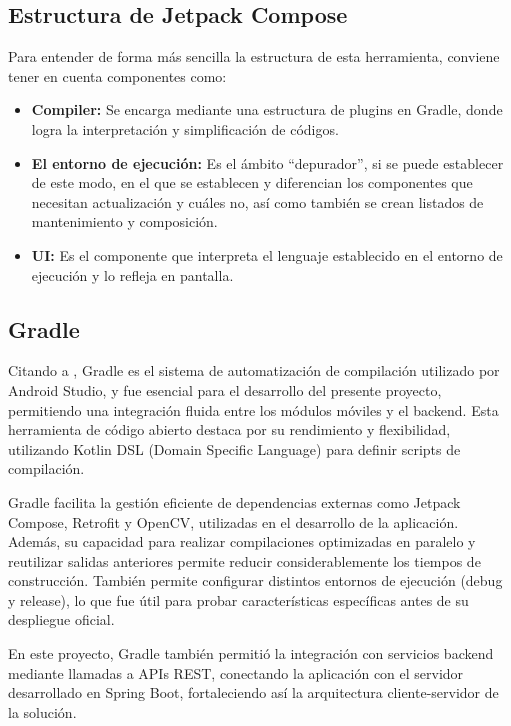 \subsection*{Estructura de Jetpack Compose}
Para entender de forma más sencilla la estructura de esta herramienta, conviene tener en cuenta componentes como:
\begin{itemize}
	\item \textbf{Compiler:} Se encarga mediante una estructura de plugins en Gradle, donde logra la interpretación y simplificación de códigos.
	\item \textbf{El entorno de ejecución:} Es el ámbito “depurador”, si se puede establecer de este modo, en el que se establecen y diferencian los componentes que necesitan actualización y cuáles no, así como también se crean listados de mantenimiento y composición.
	\item \textbf{UI:} Es el componente que interpreta el lenguaje establecido en el entorno de ejecución y lo refleja en pantalla.
\end{itemize}

\subsection{Gradle}

\begin{list}{}%
	{\setlength{\leftmargin}{1cm}\setlength{\rightmargin}{1cm}}
	\item\relax
	\small
	
	Citando a \cite{CitaD20}, Gradle es el sistema de automatización de compilación utilizado por Android Studio, y fue esencial para el desarrollo del presente proyecto, permitiendo una integración fluida entre los módulos móviles y el backend. Esta herramienta de código abierto destaca por su rendimiento y flexibilidad, utilizando Kotlin DSL (Domain Specific Language) para definir scripts de compilación. 
	
	Gradle facilita la gestión eficiente de dependencias externas como Jetpack Compose, Retrofit y OpenCV, utilizadas en el desarrollo de la aplicación. Además, su capacidad para realizar compilaciones optimizadas en paralelo y reutilizar salidas anteriores permite reducir considerablemente los tiempos de construcción. También permite configurar distintos entornos de ejecución (debug y release), lo que fue útil para probar características específicas antes de su despliegue oficial. 
	
	En este proyecto, Gradle también permitió la integración con servicios backend mediante llamadas a APIs REST, conectando la aplicación con el servidor desarrollado en Spring Boot, fortaleciendo así la arquitectura cliente-servidor de la solución.
	
\end{list}


